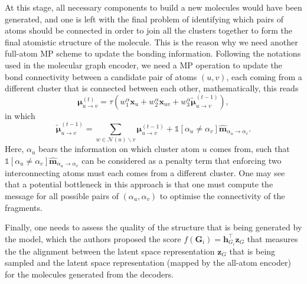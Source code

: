 \begin{myquote}
\hspace{10pt} At this stage, all necessary components to build a new molecules would have been generated, and one is left with the final problem of identifying which pairs of atoms should be connected in order to join all the clusters together to form the final atomistic structure of the molecule. This is the reason why we need another full-atom MP scheme to update the bonding information. Following the notations used in the molecular graph encoder, we need a MP operation to update the bond connectivity between a candidate pair of atoms $(u,v)$, each coming from a different cluster that is connected between each other, mathematically, this reads
\begin{equation*}
    \boldsymbol{\mu}_{u\to v}^{(t)}= \tau\left(w_1^{\alpha} \bm{x}_u+ w_2^\alpha \bm{x}_{uv}+ w_3^\alpha \tilde{\boldsymbol{\mu}}_{u\to v}^{(t-1)}\right),
\end{equation*}
in which 
\begin{equation*}
    \tilde{\boldsymbol{\mu}}_{u\to v}^{(t-1)}=\sum_{w\in\mathcal{N}(u)\backslash v}\boldsymbol{\mu}_{u\to v}^{(t-1)}+\mathds{1}[\alpha_u\neq\alpha_v]\hat{\bm{m}}_{\alpha_u\to\alpha_v}.
\end{equation*}
Here, $\alpha_u$ bears the information on which cluster atom $u$ comes from, such that $\mathds{1}[\alpha_u\neq\alpha_v]\hat{\bm{m}}_{\alpha_u\to\alpha_v}$ can be considered as a penalty term that enforcing two interconnecting atoms must each comes from a different cluster. One may see that a potential bottleneck in this approach is that one must compute the message for all possible pairs of $(\alpha_u,\alpha_v)$ to optimise the connectivity of the fragments. 

\hspace{10 pt} Finally, one needs to assess the quality of the structure that is being generated by the model, which the authors proposed the score $f(\bm{G}_i)=\bm{h}_{G_i}^\top \bm{z}_{G}$ that measures the 
the alignment between the latent space representation $\bm{z}_{G}$ that is being sampled and the latent space representation (mapped by the all-atom encoder) for the molecules generated from the decoders. 
\end{myquote}


